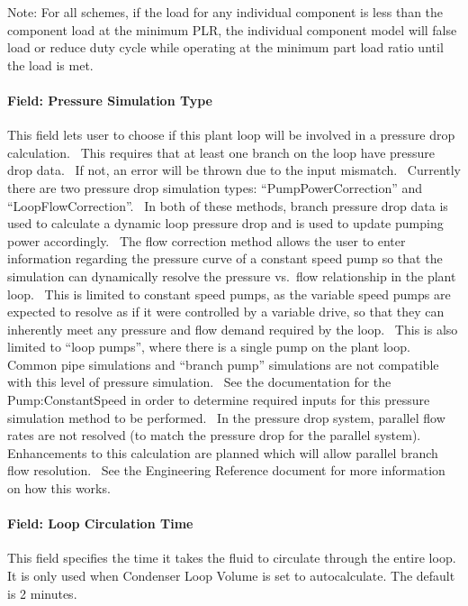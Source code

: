 Note: For all schemes, if the load for any individual component is less than the component load at the minimum PLR, the individual component model will false load or reduce duty cycle while operating at the minimum part load ratio until the load is met.

\paragraph{Field: Pressure Simulation Type}\label{field-pressure-simulation-type-1}

This field lets user to choose if this plant loop will be involved in a pressure drop calculation.~ This requires that at least one branch on the loop have pressure drop data.~ If not, an error will be thrown due to the input mismatch.~ Currently there are two pressure drop simulation types: ``PumpPowerCorrection'' and ``LoopFlowCorrection''.~ In both of these methods, branch pressure drop data is used to calculate a dynamic loop pressure drop and is used to update pumping power accordingly.~ The flow correction method allows the user to enter information regarding the pressure curve of a constant speed pump so that the simulation can dynamically resolve the pressure vs.~flow relationship in the plant loop.~ This is limited to constant speed pumps, as the variable speed pumps are expected to resolve as if it were controlled by a variable drive, so that they can inherently meet any pressure and flow demand required by the loop.~ This is also limited to ``loop pumps'', where there is a single pump on the plant loop.~ Common pipe simulations and ``branch pump'' simulations are not compatible with this level of pressure simulation.~ See the documentation for the Pump:ConstantSpeed in order to determine required inputs for this pressure simulation method to be performed.~ In the pressure drop system, parallel flow rates are not resolved (to match the pressure drop for the parallel system).~ Enhancements to this calculation are planned which will allow parallel branch flow resolution.~ See the Engineering Reference document for more information on how this works.

\paragraph{Field: Loop Circulation Time}\label{field-pressure-simulation-type}

This field specifies the time it takes the fluid to circulate through the entire loop. It is only used when Condenser Loop Volume is set to autocalculate. The default is 2 minutes. 

